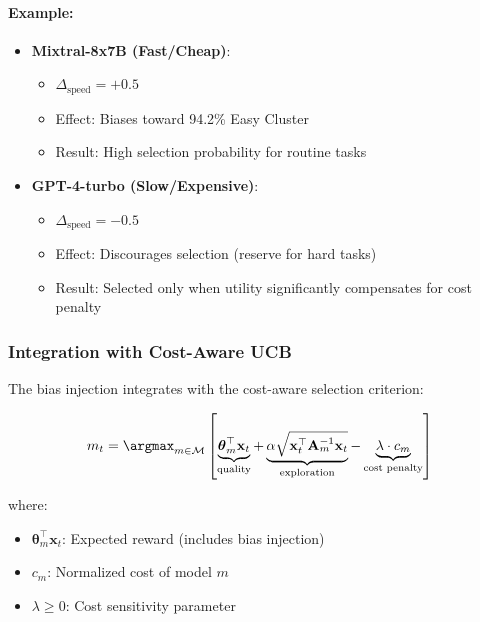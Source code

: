 \documentclass[sigconf]{acmart}
\begin{document}
\paragraph{Example:}
\begin{itemize}
    \item \textbf{Mixtral-8x7B (Fast/Cheap)}: 
    \begin{itemize}
        \item $\Delta_{\text{speed}} = +0.5$
        \item Effect: Biases toward 94.2\% Easy Cluster
        \item Result: High selection probability for routine tasks
    \end{itemize}
    
    \item \textbf{GPT-4-turbo (Slow/Expensive)}:
    \begin{itemize}
        \item $\Delta_{\text{speed}} = -0.5$
        \item Effect: Discourages selection (reserve for hard tasks)
        \item Result: Selected only when utility significantly compensates for cost penalty
    \end{itemize}
\end{itemize}

\subsubsection{Integration with Cost-Aware UCB}

The bias injection integrates with the cost-aware selection criterion:

\begin{equation}
m_t = \argmax_{m \in \mathcal{M}} \left[ \underbrace{\boldsymbol{\theta}_m^\top \mathbf{x}_t}_{\text{quality}} + \underbrace{\alpha \sqrt{\mathbf{x}_t^\top \mathbf{A}_m^{-1} \mathbf{x}_t}}_{\text{exploration}} - \underbrace{\lambda \cdot c_m}_{\text{cost penalty}} \right]
\label{eq:cost_aware_ucb}
\end{equation}

where:
\begin{itemize}
    \item $\boldsymbol{\theta}_m^\top \mathbf{x}_t$: Expected reward (includes bias injection)
    \item $c_m$: Normalized cost of model $m$ 
    \item $\lambda \geq 0$: Cost sensitivity parameter
\end{itemize}
\end{document}
